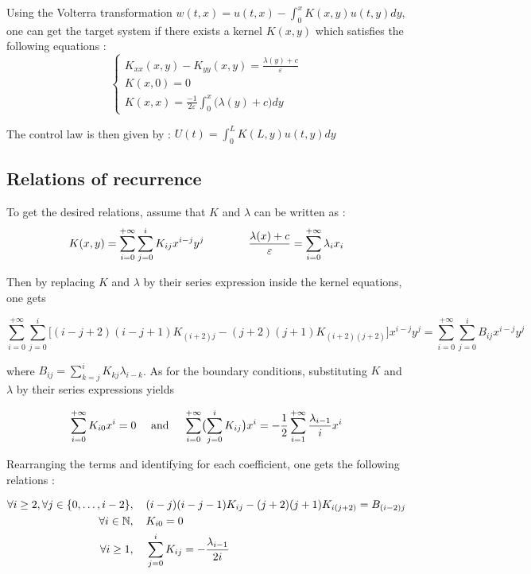 \documentclass[11pt,a4paper]{article}
\newcommand{\N}{\mathbb{N}}
\newcommand{\eps}{\varepsilon}
\begin{document}
Using the Volterra transformation $w(t,x) = u(t,x) - \int_{0}^{x}K(x,y)u(t,y) dy$, one can get the target system if there exists a kernel $K(x,y)$ which satisfies the following equations : 
$$\begin{cases}
  K_{xx}(x,y) - K_{yy}(x,y) = \frac{\lambda(y)+c}{\eps} \\
  K(x,0) = 0 \\
  K(x,x) = \frac{-1}{2\eps}\int_{0}^{x} \bigl(\lambda(y) + c\bigr) dy 
\end{cases}$$

The control law is then given by : $U(t) = \int_{0}^{L} K(L,y)u(t,y) dy$

\subsection{Relations of recurrence}

To get the desired relations, assume that $K$ and $\lambda$ can be written as :
$$K(x,y) = \sum_{i=0}^{+\infty} \sum_{j=0}^i K_{ij}x^{i-j}y^j \text{\hspace{4em}} \frac{\lambda(x)+c}{\eps} = \sum_{i=0}^{+\infty}\lambda_i x_i$$

Then by replacing $K$ and $\lambda$ by their series expression inside the kernel equations, one gets

$$\sum_{i=0}^{+\infty}\sum_{j=0}^{i}\bigl[(i-j+2)(i-j+1)K_{(i+2)j} - (j+2)(j+1)K_{(i+2)(j+2)}\bigr]x^{i-j}y^j = \sum_{i=0}^{+\infty}\sum_{j=0}^{i}B_{ij}x^{i-j}y^j$$

where $B_{ij} = \sum_{k=j}^{i}K_{kj}\lambda_{i-k}$. As for the boundary conditions, substituting $K$ and $\lambda$ by their series expressions yields

$$
  \sum_{i=0}^{+\infty}K_{i0}x^i = 0 \text{\hspace{1em} and \hspace{1em}}
  \sum_{i=0}^{+\infty}\bigl(\sum_{j=0}^{i}K_{ij}\bigr)x^i = -\frac{1}{2}\sum_{i=1}^{+\infty}\frac{\lambda_{i-1}}{i}x^i
$$

Rearranging the terms and identifying for each coefficient, one gets the following relations : 

\begin{align}
  \forall i \geq 2, \forall j \in \left\{0, \dots, i-2\right\} &, \text{\hspace{1em}} (i-j)(i-j-1)K_{ij} - (j+2)(j+1)K_{i(j+2)} = B_{(i-2)j} \\
  \forall i \in \N&, \text{\hspace{1em}} K_{i0} =0 \\
  \forall i \geq 1&, \text{\hspace{1em}} \sum_{j=0}^{i}K_{ij} = -\frac{\lambda_{i-1}}{2i}
\end{align}
\end{document}
